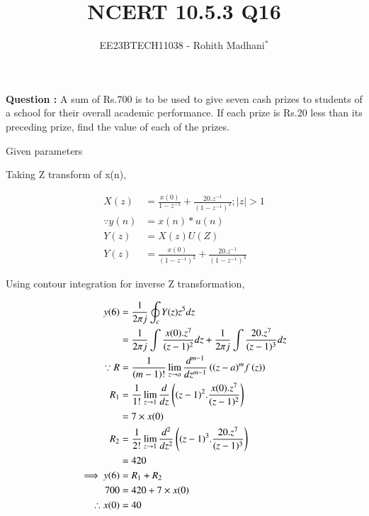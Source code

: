 \documentclass[journal,12pt,twocolumn]{IEEEtran}
\theoremstyle{remark}
\begin{document}

\vspace{3cm}

\title{NCERT 10.5.3 Q16}
\author{EE23BTECH11038 - Rohith Madhani$^{*}$%
}
\maketitle
\newpage
\bigskip
\renewcommand{\thefigure}{\theenumi}
\renewcommand{\thetable}{\theenumi}

\textbf{Question :} A sum of Rs.700 is to be used to give seven cash prizes to students of a school for their overall academic performance. If each prize is 
Rs.20 less than its preceding prize, find the value of each of the prizes.

\solution 

\begin{table}[!h] 
\centering

\caption{Given parameters}
\label{table:Parameters list}
\end{table}

Taking Z transform of x(n),

\begin{align}
    X(z) &= \frac{x(0)}{1-z^{-1}} + \frac{20.z^{-1}}{(1-z^{-1})^2} ; |z|>1 \\
    \because y(n) &= x(n)*u(n) \\
    Y(z) &= X(z)U(Z) \\
    Y(z) &= \frac{x(0)}{(1-z^{-1})^2} + \frac{20.z^{-1}}{(1-z^{-1})^3}
\end{align}

Using contour integration for inverse Z transformation, 

\begin{align}
    y(6) &= \frac{1}{2\pi j}\oint_c Y(z) z^{5} dz \\
    &= \frac{1}{2\pi j}\int \frac{x(0).z^{7}}{(z-1)^{2}} dz + \frac{1}{2\pi j}\int \frac{20.z^{7}}{(z-1)^{3}} dz\\
    \because R&=\frac{1}{\left(m-1\right)!}\lim\limits_{z\to a}\frac{d^{m-1}}{dz^{m-1}}\left({(z-a)}^{m}f\left(z\right)\right)\\
    R_1 &=\frac{1}{1!}\lim\limits_{z\to 1}\frac{d}{dz}\left((z-1)^2.\frac{x(0).z^{7}}{(z-1)^{2}}\right)\\
    &= 7 \times x(0)\\
    R_2 &=\frac{1}{2!}\lim\limits_{z\to 1}\frac{d^2}{dz^2}\left((z-1)^3.\frac{20.z^{7}}{(z-1)^{3}}\right)\\
    &= 420\\
    \implies y(6) &= R_1 + R_2 \\
    700 &= 420 + 7 \times x(0) \\
    \therefore x(0) &= 40
\end{align}
\end{document}

